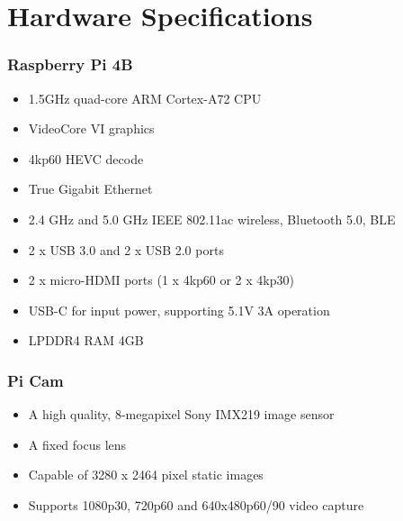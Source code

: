 \chapter{Hardware Specifications}
    \label{appendices:hardware_specs}
        \subsection{Raspberry Pi 4B}
        \begin{itemize}
            \item 1.5GHz quad-core ARM Cortex-A72 CPU
            \item VideoCore VI graphics
            \item 4kp60 HEVC decode
            \item True Gigabit Ethernet
            \item 2.4 GHz and 5.0 GHz IEEE 802.11ac wireless, Bluetooth 5.0, BLE
            \item 2 x USB 3.0 and 2 x USB 2.0 ports
            \item 2 x micro-HDMI ports (1 x 4kp60 or 2 x 4kp30)
            \item USB-C for input power, supporting 5.1V 3A operation
            \item LPDDR4 RAM 4GB
        \end{itemize}
        
        \subsection{Pi Cam}
        \begin{itemize}
            \item A high quality, 8-megapixel Sony IMX219 image sensor
            \item A fixed focus lens
            \item Capable of 3280 x 2464 pixel static images
            \item Supports 1080p30, 720p60 and 640x480p60/90 video capture
        \end{itemize}